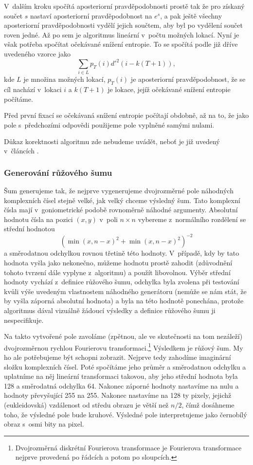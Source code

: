 V~dalším kroku spočítá aposteriorní pravděpodobnosti prostě tak že pro získaný
součet $s$ nastaví aposteriorní pravděpodobnost na $e^s$, a pak ještě všechny
aposteriorní pravděpodobnosti vydělí jejich součtem, aby byl po vydělení součet
roven jedné. Až po sem je algoritmus lineární v~počtu možných lokací. Nyní je
však potřeba spočítat očekávané snížení entropie. To se spočítá podle již dříve
uvedeného vzorce jako $$\displaystyle\sum_{i\in L} p_T(i)d'^2(i-k(T+1)),$$ kde
$L$ je množina možných lokací, $p_T(i)$ je aposteriorní pravděpodobnost, že se
cíl nachází v~lokaci $i$ a $k(T+1)$ je lokace, jejíž očekávané snížení entropie
počítáme.   

Před první fixací se očekávaná snížení entropie počítají obdobně, až na to, že
jako pole s~předchozími odpovědi použijeme pole vyplněné samými nulami.

Důkaz korektnosti algoritmu zde nebudeme uvádět, neboť je již uvedený v~článcích \citep{Najemnik05, Najemnik08, Najemnik09}.

\subsubsection*{Generování růžového šumu}


Šum generujeme tak, že nejprve vygenerujeme dvojrozměrné pole náhodných
komplexních čísel stejně velké, jak velký chceme výsledný šum. Tato komplexní
čísla mají v~goniometrické podobě rovnoměrně náhodné argumenty. Absolutní
hodnotu čísla na pozici $(x,y)$ v~poli $n\times n$ vybereme z~normálního
rozdělení se střední hodnotou \begin{equation}\label{Pink}\left(\min\left(x,n-x\right)^2
+\min\left(x,n-x\right)^2\right)^{-2}\end{equation} a směrodatnou odchylkou rovnou třetině
této hodnoty. V~případě, kdy by tato hodnota vyšla jako nekonečno, můžeme
hodnotu prostě zahodit (zdůvodnění tohoto tvrzení dále vyplyne z~algoritmu) a
použít libovolnou. Výběr střední hodnoty vychází z~definice růžového šumu,
odchylka byla zvolena při testování kvůli výše uvedeným vlastnostem náhodného
generátoru (nemůže se nám stát, že by vyšla záporná absolutní hodnota) a byla
na této hodnotě ponechána, protože algoritmus dával vizuálně žádoucí výsledky a
definice růžového šumu ji nespecifikuje.

Na takto vytvořené pole zavoláme (zpětnou, ale ve skutečnosti na tom nezáleží)
dvojrozměrnou rychlou Fourierovu transformaci.\footnote{Dvojrozměrná diskrétní
Fourierova transformace je Fourierova transformace nejprve provedená po řádcích
a potom po sloupcích.}  Výsledkem je růžový šum. My ho ale potřebujeme být
schopni zobrazit. Nejprve tedy zahodíme imaginární složku komplexních čísel.
Poté spočítáme jeho průměr a směrodatnou odchylku a uplatníme na něj lineární
transformaci takovou, aby jeho střední hodnota byla 128 a směrodatná odchylka
64. Nakonec záporné hodnoty nastavíme na nulu a hodnoty převyšující 255 na 255.
Nakonec nastavíme na 128 ty pixely, jejichž (eukleidovská) vzdálenost od středu
obrazu je větší než $n/2$, čímž dosáhneme toho, že výsledné pole bude kruhové.
Výsledné pole interpretujeme jako černobílý obraz s~osmi bity na pixel.



